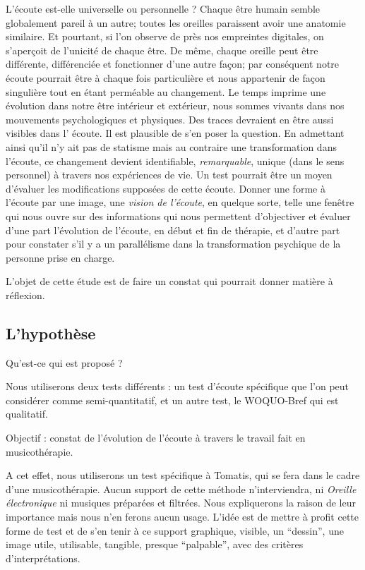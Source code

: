 L'écoute est-elle universelle ou personnelle ?
 Chaque être humain semble  globalement pareil à un autre; toutes les oreilles 
paraissent  avoir une anatomie similaire. Et pourtant, si l'on observe de près 
nos empreintes digitales, on s'aperçoit de l'unicité de chaque être. De même, 
chaque oreille peut être différente, différenciée et  fonctionner d'une autre 
façon;  par conséquent notre  écoute pourrait être à chaque fois particulière 
et nous appartenir de façon singulière tout en étant perméable au changement.
Le temps imprime une évolution dans notre être intérieur et extérieur, nous 
sommes vivants dans nos mouvements psychologiques et physiques. Des traces 
devraient en être aussi visibles dans l' écoute. Il est plausible de s'en poser 
la question.
En admettant ainsi qu'il n'y ait pas de statisme mais au contraire une 
transformation dans l'écoute, ce changement devient identifiable, 
\textit{remarquable}, unique (dans le sens personnel) à travers nos expériences 
de vie.  Un test pourrait être un moyen d'évaluer les modifications supposées 
de cette écoute. 
Donner une forme à l'écoute par une image, une \emph{vision de l'écoute}, en 
quelque sorte, telle une fenêtre qui nous ouvre sur des informations qui nous 
permettent d'objectiver et évaluer d'une part 
 l'évolution de l'écoute, en début et fin de thérapie, et d'autre part pour 
constater s'il y a un parallélisme dans la transformation psychique  de la 
personne prise en charge.

L'objet de cette étude est de faire un constat
qui pourrait donner matière à réflexion.


\subsection{L'hypothèse}

Qu'est-ce qui est proposé ? 
	
	Nous utiliserons deux tests différents : 
	un test d'écoute spécifique que l'on peut considérer comme 
semi-quantitatif, 
	et un autre test, le WOQUO-Bref qui est qualitatif.
	
Objectif : constat de l'évolution de l'écoute à travers le travail fait en 
musicothérapie.



A cet effet, nous utiliserons un test spécifique à Tomatis, qui se fera dans le 
cadre d'une musicothérapie. Aucun support de cette méthode n'interviendra, ni 
\textsl{Oreille
	électronique} ni musiques préparées et filtrées. Nous expliquerons la 
raison de   leur importance mais nous n'en ferons aucun usage. L'idée est de 
mettre à profit cette forme de test et de  s'en tenir à ce support
graphique, visible, un ``dessin'', une image utile, utilisable, tangible,
presque ``palpable'', avec des critères
d'interprétations.
	



